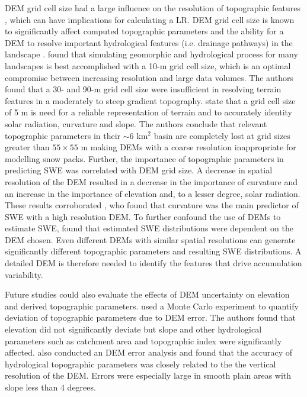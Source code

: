 \documentclass[twocolumn,letterpaper]{igs}
\begin{document}
DEM grid cell size had a large influence on the resolution of topographic features \citep{Lopez2010} , which can have implications for calculating a LR. DEM grid cell size is known to significantly affect computed topographic parameters and the ability for a DEM to resolve important hydrological features (i.e. drainage pathways) in the landscape \citep{Zhang1994, Garbrecht1994, Guo-an2001}. \cite{Zhang1994} found that simulating geomorphic and hydrological process for many landscapes is best accomplished with a 10-m grid cell size, which is an optimal compromise between increasing resolution and large data volumes. The authors found that a 30- and 90-m grid cell size were insufficient in resolving terrain features in a  moderately to steep gradient topography. \cite{Lopez2010} state that a grid cell size of 5 m is need for a reliable representation of terrain and to accurately identity solar radiation, curvature and slope. The authors conclude that relevant topographic parameters in their $\sim$6 km$^2$ basin are completely lost at grid sizes greater than $55\times55$ m making DEMs with a coarse resolution inappropriate for modelling snow packs. Further, the importance of topographic parameters in predicting SWE was correlated with DEM grid size. A decrease in spatial resolution of the DEM resulted in a decrease in the importance of curvature and an increase in the importance of elevation and, to a lesser degree, solar radiation. These results corroborated \cite{Kienzle2004}, who found that curvature was the main predictor of SWE with a high resolution DEM. To further confound the use of DEMs to estimate SWE, \cite{Molotch2005} found that estimated SWE distributions were dependent on the DEM chosen. Even different DEMs with similar spatial resolutions can generate significantly different topographic parameters and resulting SWE distributions. A detailed DEM is therefore needed to identify the features that drive accumulation variability. 

Future studies could also evaluate the effects of DEM uncertainty on elevation and derived topographic parameters. \cite{Wechsler2006} used a Monte Carlo experiment to quantify deviation of topographic parameters due to DEM error. The authors found that elevation did not significantly deviate but slope and other hydrological parameters such as catchment area and topographic index were significantly affected. \cite{Guo-an2001} also conducted an DEM error analysis and found that the accuracy of hydrological topographic parameters was closely related to the the vertical resolution of the DEM. Errors were especially large in smooth plain areas with slope less than 4 degrees.
\end{document}
